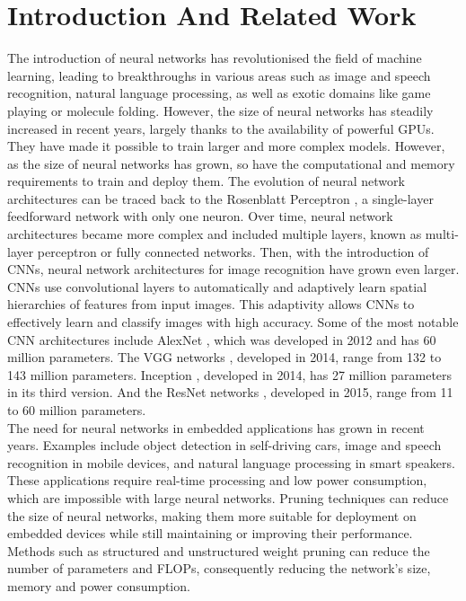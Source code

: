 \section{Introduction And Related Work}
The introduction of neural networks has revolutionised the field of machine
learning, leading to breakthroughs in various areas such as image and speech
recognition, natural language processing, as well as exotic domains like game
playing or molecule folding. However, the size of neural networks has steadily
increased in recent years, largely thanks to the availability of powerful
\ac{GPUs}. They have made it possible to train larger and more complex models.
However, as the size of neural networks has grown, so have the computational and
memory requirements to train and deploy them. The evolution of neural network
architectures can be traced back to the Rosenblatt Perceptron
\cite{rosenblatt1958perceptron}, a single-layer feedforward network with only
one neuron. Over time, neural network architectures became more complex and
included multiple layers, known as multi-layer perceptron or fully connected
networks. Then, with the introduction of \ac{CNNs}, neural network architectures
for image recognition have grown even larger. \ac{CNNs} use
convolutional layers to automatically and adaptively learn spatial hierarchies
of features from input images. This adaptivity allows \ac{CNNs} to effectively
learn and classify images with high accuracy. Some of the most notable \ac{CNN}
architectures include AlexNet \cite{DBLP:conf/nips/KrizhevskySH12}, which was
developed in 2012 and has 60 million parameters. The VGG networks
\cite{DBLP:journals/corr/SimonyanZ14a}, developed in 2014, range from 132 to 143
million parameters. Inception \cite{DBLP:conf/cvpr/SzegedyLJSRAEVR15}, developed
in 2014, has 27 million parameters in its third version. And the ResNet networks
\cite{DBLP:conf/cvpr/HeZRS16}, developed in 2015, range from 11 to 60
million parameters. \\


The need for neural networks in embedded applications has grown in recent years.
Examples include object detection in self-driving cars, image and speech
recognition in mobile devices, and natural language processing in smart
speakers. These applications require real-time processing and low power
consumption, which are impossible with large neural networks. Pruning techniques
can reduce the size of neural networks, making them more suitable for deployment
on embedded devices while still maintaining or improving their performance.
Methods such as structured and unstructured weight pruning can reduce the number
of parameters and \ac{FLOPs}, consequently reducing the network's size, memory and
power consumption.\\


